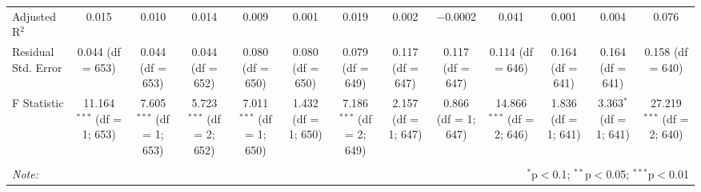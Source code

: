 \begin{table}[!htbp]
\begin{tabular}{@{\extracolsep{5pt}}lcccccccccccc}
Adjusted R$^{2}$ & 0.015 & 0.010 & 0.014 & 0.009 & 0.001 & 0.019 & 0.002 & $-$0.0002 & 0.041 & 0.001 & 0.004 & 0.076 \\ 
Residual Std. Error & 0.044 (df = 653) & 0.044 (df = 653) & 0.044 (df = 652) & 0.080 (df = 650) & 0.080 (df = 650) & 0.079 (df = 649) & 0.117 (df = 647) & 0.117 (df = 647) & 0.114 (df = 646) & 0.164 (df = 641) & 0.164 (df = 641) & 0.158 (df = 640) \\ 
F Statistic & 11.164$^{***}$ (df = 1; 653) & 7.605$^{***}$ (df = 1; 653) & 5.723$^{***}$ (df = 2; 652) & 7.011$^{***}$ (df = 1; 650) & 1.432 (df = 1; 650) & 7.186$^{***}$ (df = 2; 649) & 2.157 (df = 1; 647) & 0.866 (df = 1; 647) & 14.866$^{***}$ (df = 2; 646) & 1.836 (df = 1; 641) & 3.363$^{*}$ (df = 1; 641) & 27.219$^{***}$ (df = 2; 640) \\ 
\hline 
\hline \\[-1.8ex] 
\textit{Note:}  & \multicolumn{12}{r}{$^{*}$p$<$0.1; $^{**}$p$<$0.05; $^{***}$p$<$0.01} \\ 
\end{tabular} 
\end{table} 
